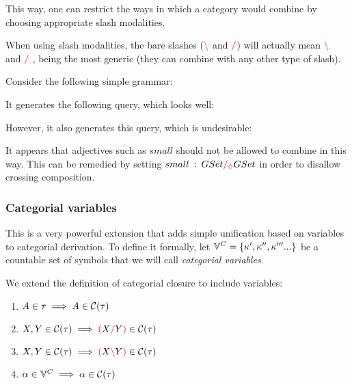 \documentclass[main.tex]{subfiles}
\begin{document}
This way, one can restrict the ways in which a category would
combine by choosing appropriate slash modalities.

When using slash modalities, the bare slashes ($\textcolor{red}{\backslash}$ and $\textcolor{red}{/}$) will actually
mean $\textcolor{red}{\backslash_{.}}$ and $\textcolor{red}{/_{.}}$, being the most generic (they
can combine with any other type of slash).

\begin{example}
    Consider the following simple grammar:

    It generates the following query, which looks well:

    However, it also generates this query, which is undesirable:

    It appears that adjectives such as $small$ should not be allowed to combine
    in this way. This can be remedied by setting $small \hspace{0.5em} {:} \hspace{0.5em} GSet \textcolor{red}{/_{\lozenge}} GSet$
    in order to disallow crossing composition.
\end{example}

\subsubsection{Categorial variables}
\label{hack:catvars}
This is a very powerful extension that adds simple unification based on variables
to categorial derivation. To define it formally, let $\mathbb{V}^{C} = \{ \kappa', \kappa'', \kappa''' ...\}$
be a countable set of symbols that we will call \emph{categorial variables}.

\begin{defn}
    We extend the definition of categorial closure to include variables:
    \begin{enumerate}
        \item \label{cvar:atomic} $A \in \tau \implies A \in \mathcal{C}( \tau )$
        \item \label{cvar:right}  $X, Y \in \mathcal{C}( \tau ) \implies \textcolor{red}{(} X \textcolor{red}{/} Y \textcolor{red}{)} \in \mathcal{C}( \tau )$
        \item \label{cvar:left}   $X, Y \in \mathcal{C}( \tau ) \implies \textcolor{red}{(} X \textcolor{red}{\backslash} Y \textcolor{red}{)} \in \mathcal{C}( \tau )$
        \item \label{cvar:var}    $\alpha \in \mathbb{V}^{C} \implies \alpha \in \mathcal{C}( \tau )$
    \end{enumerate}
\end{defn}
\end{document}
